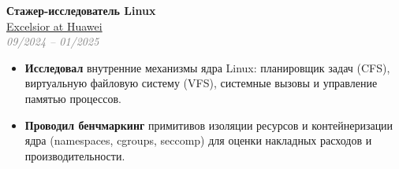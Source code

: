 \documentclass[10pt, a4paper]{article}
\begin{document}
\begin{minipage}[t]{0.55\textwidth}
\vspace{0.7cm}

\hspace{0.5cm}
\begin{minipage}[t]{0.9\textwidth}
    \raggedright
    \textbf{\Large Стажер-исследователь Linux} \\[2pt]
    \textcolor{graytext}{\href{https://rnew.tilda.ws/excelsiorathuawei}{Excelsior at Huawei}}\extlink \\
    \textcolor{graytext}{\textit{09/2024 -- 01/2025}}
    \begin{itemize}
        \item \textbf{Исследовал} внутренние механизмы ядра Linux: планировщик задач (CFS), виртуальную файловую систему (VFS), системные вызовы и управление памятью процессов.
        \item \textbf{Проводил бенчмаркинг} примитивов изоляции ресурсов и контейнеризации ядра (namespaces, cgroups, seccomp) для оценки накладных расходов и производительности.
    \end{itemize}
\end{minipage}

\end{minipage}%
\hfill %
\end{document}
